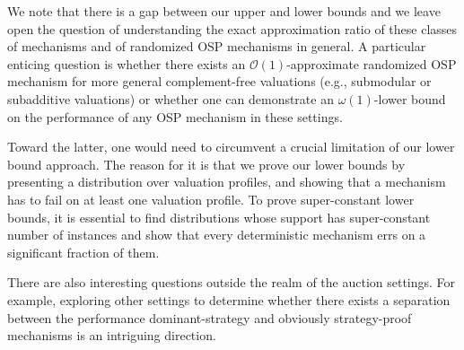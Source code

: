 

{We note that there is a gap between our upper and lower bounds and we} leave open 
the question of understanding the exact approximation ratio of these classes of mechanisms and of randomized OSP mechanisms in general.  A particular enticing question is whether there exists an $\mathcal O(1)$-approximate randomized OSP mechanism for more general complement-free valuations (e.g., submodular or subadditive valuations) or whether one can demonstrate an $\omega(1)$-lower bound on the performance of any OSP mechanism in these settings.  

Toward the latter, one would need to circumvent a crucial limitation of our lower bound approach. The reason for it is that we  prove our lower bounds
by presenting a distribution over valuation profiles, and showing that a mechanism has to fail on at least one valuation profile.  To prove super-constant lower bounds, it is essential to find distributions whose support has super-constant number of instances and show that every deterministic mechanism 
errs on a significant fraction of them.

There are also interesting  questions outside the realm of the auction settings.  For example, exploring other settings to determine whether there exists a separation between the performance
dominant-strategy and obviously strategy-proof mechanisms is an intriguing direction.




